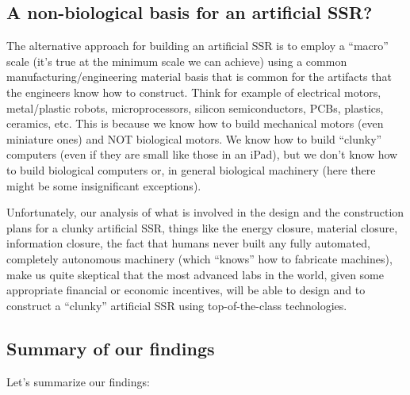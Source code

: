 \subsection{A non-biological basis for an artificial SSR?}

The alternative approach for building an artificial SSR is to employ a
“macro” scale (it’s true at the minimum scale we can achieve) using a
common manufacturing/engineering material basis that is common for the
artifacts that the engineers know how to construct. Think for example
of electrical motors, metal/plastic robots, microprocessors, silicon
semiconductors, PCBs, plastics, ceramics, etc. This is because we know
how to build mechanical motors (even miniature ones) and NOT biological
motors. We know how to build “clunky” computers (even if they are small
like those in an iPad), but we don’t know how to build biological
computers or, in general biological machinery (here there might be some
insignificant exceptions).

Unfortunately, our analysis of what is involved in  the design and the
construction plans for a clunky artificial SSR, things like the energy
closure, material closure, information closure, the fact that humans
never built any fully automated, completely autonomous machinery (which
“knows” how to fabricate machines), make us quite skeptical that the
most advanced labs in the world, given some appropriate financial or
economic incentives, will be able to design and to construct a “clunky”
 artificial SSR using top-of-the-class technologies.

\subsection{Summary of our findings}

Let’s summarize our findings:

